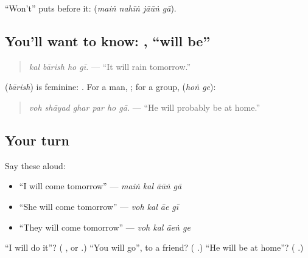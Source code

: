 \textquotedblleft{}Won't\textquotedblright{} puts \textbf{} before it: \textbf{   } (\emph{maiṅ nahīṅ jāūṅ gā}).

\subsection*{You'll want to know:  , \textquotedblleft{}will be\textquotedblright{}}
\begin{quote}
\textbf{   }
\end{quote}

\begin{quote}
\emph{kal bārish ho gī.} — \textquotedblleft{}It will rain tomorrow.\textquotedblright{}
\end{quote}

\textbf{} (\emph{bārish}) is feminine: \textbf{ }. For a man, \textbf{ }; for a group, \textbf{ } (\emph{hoṅ ge}):

\begin{quote}
\textbf{     }
\end{quote}

\begin{quote}
\emph{voh shāyad ghar par ho gā.} — \textquotedblleft{}He will probably be at home.\textquotedblright{}
\end{quote}

\subsection*{Your turn}
Say these aloud:

\begin{itemize}
\raggedright
  \item \textquotedblleft{}I will come tomorrow\textquotedblright{} — \emph{maiṅ kal āūṅ gā}
  \item \textquotedblleft{}She will come tomorrow\textquotedblright{} — \emph{voh kal āe gī}
  \item \textquotedblleft{}They will come tomorrow\textquotedblright{} — \emph{voh kal āeṅ ge}
\end{itemize}

\begin{tcolorbox}[breakable,colback=teal!4,colframe=teal!35!black,title={Before you move on}]
\textquotedblleft{}I will do it\textquotedblright{}? (\textbf{  }, or \textbf{ }.) \textquotedblleft{}You will go\textquotedblright{}, to a friend? (\textbf{  }.) \textquotedblleft{}He will be at home\textquotedblright{}? (\textbf{    }.)
\end{tcolorbox}
